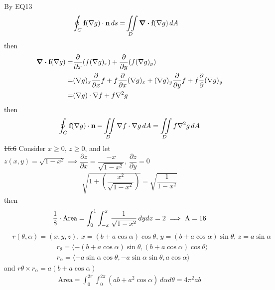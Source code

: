 \documentclass[12pt, a4paper]{article}
\begin{document}
\begin{CJK*}{UTF8}{bsmi}
By EQ13
\begin{align}
    \oint_C \textbf f(\nabla g) \cdot \textbf n \, ds =& \iint\limits_D \div {\textbf{f}(\nabla g)} \,dA
\end{align}
then
\begin{align}
    \div {\textbf{f}(\nabla g)} =&\dfrac{\partial}{\partial x}(f(\nabla g)_x)+\dfrac{\partial}{\partial y}(f(\nabla g)_y)\\
    =&(\nabla g)_x\dfrac{\partial}{\partial x} f + f\dfrac{\partial}{\partial x}(\nabla g)_x+(\nabla g)_y \dfrac{\partial}{\partial y}f + f\dfrac{\partial}{\partial}(\nabla g)_y\\
    =&(\nabla g)\cdot \nabla f+f\nabla^2 g
\end{align}
then
\begin{align}
    \oint_C \textbf f(\nabla g) \cdot \textbf n - \iint\limits_D \nabla f \cdot \nabla g \,dA=\iint\limits_D f\nabla^2 g\,dA
\end{align}
\st{16.6}
Consider $x\ge 0,\,z\ge 0$, and let $z(x,y) = \sqrt{1-x^2} \implies \dfrac{\partial z}{\partial x}=\dfrac{-x}{\sqrt{1-x^2}},\,\dfrac{\partial z}{\partial y}=0$
\begin{align}
    \sqrt{1+(\dfrac{x^2}{\sqrt{1-x^2}})}=\sqrt{\dfrac{1}{1-x^2}}
\end{align}
then
\begin{align}
    \dfrac{1}{8}\cdot \text{Area} = \int_0^1\int_{-x}^x \dfrac{1}{\sqrt{1-x^2}}\,dy dx=2 \implies \text{A} = 16
\end{align}
\begin{align}
    &r(\theta,\alpha) = (x,y,z),\,x=(b+a\cos \alpha)\cos \theta,\, y=(b+a\cos\alpha) \sin\theta,\,z=a\sin\alpha
\end{align}
\begin{align}
    &r_\theta = \langle -(b+a\cos\alpha)\sin\theta,(b+a\cos \alpha)\cos\theta \rangle\\
    &r_\alpha = \langle -a\sin\alpha \cos \theta, -a\sin\alpha\sin\theta,a\cos\alpha\rangle
\end{align}
and $r\theta \times r_\alpha = a(b+a\cos\alpha)$
\begin{align}
    \text{Area} = \int_0^{2\pi} \int_0^{2\pi}(ab+a^2\cos \alpha) \,d\alpha d\theta=4\pi^2 ab
\end{align}
\end{CJK*}
\end{document}
